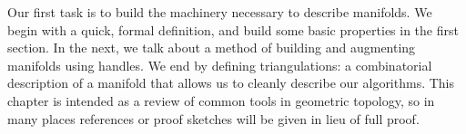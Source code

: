 Our first task is to build the machinery necessary to describe manifolds.
We begin with a quick, formal definition, and build some basic properties in the first section.
In the next, we talk about a method of building and augmenting manifolds using handles.
We end by defining triangulations: a combinatorial description of a manifold that allows us to cleanly describe our algorithms.
This chapter is intended as a review of common tools in geometric topology, so in many places references or proof sketches will be given in lieu of full proof.